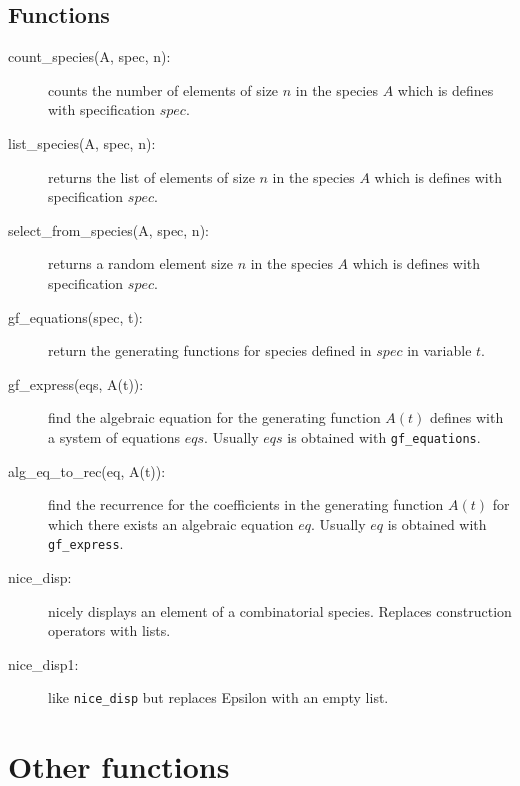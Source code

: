 \documentclass[11pt]{article}
\begin{document}
\subsection{Functions}

\begin{description}
  \item[count\_species(A, spec, n):] counts the number of elements of
    size $n$ in the species $A$ which is defines with specification
    $spec$.
  \item[list\_species(A, spec, n):] returns the list of elements of
    size $n$ in the species $A$ which is defines with specification
    $spec$.
  \item[select\_from\_species(A, spec, n):] returns a random element
    size $n$ in the species $A$ which is defines with specification
    $spec$.
  \item[gf\_equations(spec, t):] return the generating functions for
    species defined in $spec$ in variable $t$.
  \item[gf\_express(eqs, A(t)):] find the algebraic equation for the
    generating function $A(t)$ defines with a system of equations
    $eqs$. Usually $eqs$ is obtained with \texttt{gf\_equations}.
  \item[alg\_eq\_to\_rec(eq, A(t)):] find the recurrence for the
    coefficients in the generating function $A(t)$ for which there
    exists an algebraic equation $eq$. Usually $eq$ is obtained with
    \texttt{gf\_express}.
   \item[nice\_disp:] nicely displays an element of a combinatorial
   	species. Replaces construction operators with lists.
   \item[nice\_disp1:] like \verb|nice_disp| but replaces Epsilon with
   	an empty list.
\end{description}

\section{Other functions}
\end{document}

